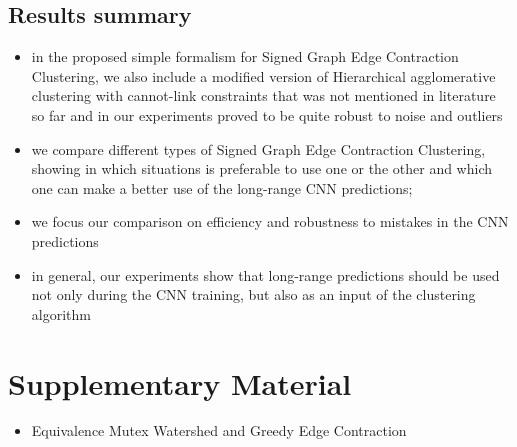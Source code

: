 \documentclass[10pt,twocolumn,letterpaper]{article}
\begin{document}
\subsection{Results summary}
\begin{itemize}
\item in the proposed simple formalism for Signed Graph Edge Contraction Clustering, we also include a modified version of Hierarchical agglomerative clustering with cannot-link constraints that was not mentioned in literature so far and in our experiments proved to be quite robust to noise and outliers
\item we compare different types of Signed Graph Edge Contraction Clustering, showing in which situations is preferable to use one or the other and which one can make a better use of the long-range CNN predictions; 
\item we focus our comparison on efficiency and robustness to mistakes in the CNN predictions 
\item in general, our experiments show that long-range predictions should be used not only during the CNN training, but also as an input of the clustering algorithm

\end{itemize}

{\small


}

\section{Supplementary Material}
\begin{itemize}
\item Equivalence Mutex Watershed and Greedy Edge Contraction
\end{itemize}




\end{document}

